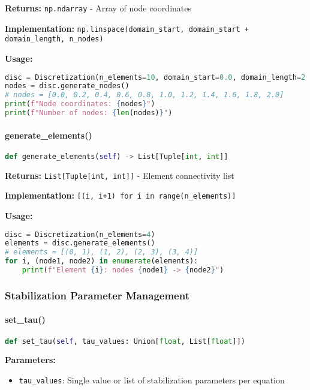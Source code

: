 \textbf{Returns:} \texttt{np.ndarray} - Array of node coordinates

\textbf{Implementation:} \texttt{np.linspace(domain\_start, domain\_start + domain\_length, n\_nodes)}

\textbf{Usage:}
\begin{lstlisting}[language=Python, caption=Node Generation Usage]
disc = Discretization(n_elements=10, domain_start=0.0, domain_length=2.0)
nodes = disc.generate_nodes()
# nodes = [0.0, 0.2, 0.4, 0.6, 0.8, 1.0, 1.2, 1.4, 1.6, 1.8, 2.0]
print(f"Node coordinates: {nodes}")
print(f"Number of nodes: {len(nodes)}")
\end{lstlisting}

\paragraph{generate\_elements()}
\begin{lstlisting}[language=Python, caption=Generate Elements Method]
def generate_elements(self) -> List[Tuple[int, int]]
\end{lstlisting}

\textbf{Returns:} \texttt{List[Tuple[int, int]]} - Element connectivity list

\textbf{Implementation:} \texttt{[(i, i+1) for i in range(n\_elements)]}

\textbf{Usage:}
\begin{lstlisting}[language=Python, caption=Element Generation Usage]
disc = Discretization(n_elements=4)
elements = disc.generate_elements()
# elements = [(0, 1), (1, 2), (2, 3), (3, 4)]
for i, (node1, node2) in enumerate(elements):
    print(f"Element {i}: nodes {node1} -> {node2}")
\end{lstlisting}

\subsubsection{Stabilization Parameter Management}

\paragraph{set\_tau()}
\begin{lstlisting}[language=Python, caption=Set Tau Method]
def set_tau(self, tau_values: Union[float, List[float]])
\end{lstlisting}

\textbf{Parameters:}
\begin{itemize}
    \item \texttt{tau\_values}: Single value or list of stabilization parameters per equation
\end{itemize}

